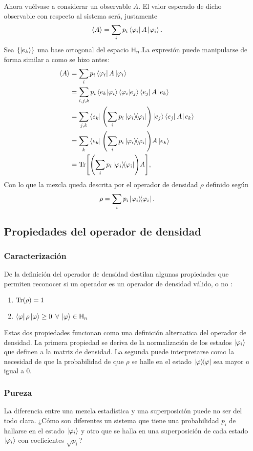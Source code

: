 Ahora vuélvase a considerar un observable $A$. El valor esperado de dicho observable con respecto al sistema será, justamente
\begin{equation*}
\expval{A}=\sum_{i}p_{i}\bra{\varphi_{i}}A\ket{\varphi_{i}}.
\end{equation*}
Sea $\{\ket{e_{k}}\}$ una base ortogonal del espacio ${\sf H}_{n}$.La expresión puede manipularse de forma similar a como se hizo antes:
\begin{align*}
\expval{A}&=\sum_{i}p_{i}\bra{\varphi_{i}}A\ket{\varphi_{i}}\\
&=\sum_{i,j,k}p_{i}\bra{e_{k}}\ket{\varphi_{i}}\bra{\varphi_{i}}\ket{e_{j}} \bra{e_{j}}A\ket{e_{k}}\\
&=\sum_{j,k}\bra{e_{k}}\qty(\sum_{i}p_{i}\dyad{\varphi_{i}})\ket{e_{j}} \bra{e_{j}}A\ket{e_{k}}\\
&=\sum_{k}\bra{e_{k}}\qty(\sum_{i}p_{i}\dyad{\varphi_{i}})A\ket{e_{k}}\\
&=\Tr[\qty(\sum_{i}p_{i}\dyad{\varphi_{i}})A]\rlap{,}
\end{align*}
Con lo que la mezcla queda descrita por el operador de densidad $\rho$ definido según
\begin{equation}\label{eq:DensOpMix}
\rho=\sum_{i}p_{i}\dyad{\varphi_{i}}.
\end{equation}
\subsection{Propiedades del operador de densidad}
\subsubsection{Caracterización}
De la definición del operador de densidad destilan algunas propiedades que permiten reconocer si un operador es un operador de densidad válido, o no \cite{Holevo}:
\begin{enumerate}
    \item $\Tr(\rho)=1$
    \item $\bra{\varphi}\rho\ket{\varphi}\geq 0$ $\forall$ $\ket{\varphi}\in{\sf H}_{n}$
\end{enumerate}
Estas dos propiedades funcionan como una definición alternatica del operador de densidad. La primera propiedad se deriva de la normalización de los estados $\ket{\varphi_{i}}$ que definen a la matriz de densidad. La segunda puede interpretarse como la necesidad de que la probabilidad de que $\rho$ se halle en el estado $\dyad{\varphi}$ sea mayor o igual a $0$.
\subsubsection{Pureza}
La diferencia entre una mezcla estadística y una superposición puede no ser del todo clara. ¿Cómo son diferentes un sistema que tiene una probabilidad $p_{i}$ de hallarse en el estado $\ket{\varphi_{i}}$ y otro que se halla en una superposición de cada estado $\ket{\varphi_{i}}$ con coeficientes $\sqrt{p_{i}}$? 

